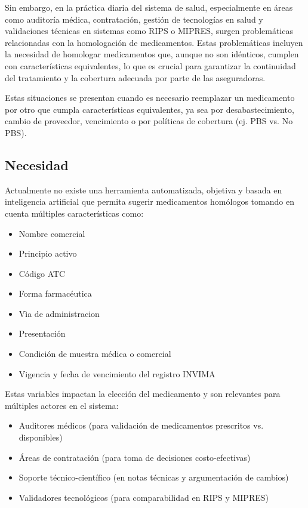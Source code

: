 \documentclass[conference]{IEEEtran}
\begin{document}
Sin embargo, en la práctica diaria del sistema de salud, especialmente en áreas como auditoría médica, contratación, gestión de tecnologías en salud y validaciones técnicas en sistemas como RIPS o MIPRES, surgen problemáticas relacionadas con la homologación de medicamentos. Estas problemáticas incluyen la necesidad de homologar medicamentos que, aunque no son idénticos, cumplen con características equivalentes, lo que es crucial para garantizar la continuidad del tratamiento y la cobertura adecuada por parte de las aseguradoras.

Estas situaciones se presentan cuando es necesario reemplazar un medicamento por otro que cumpla características equivalentes, ya sea por desabastecimiento, cambio de proveedor, vencimiento o por políticas de cobertura (ej. PBS vs. No PBS).



\subsection{Necesidad}\label{AA}
Actualmente no existe una herramienta automatizada, objetiva y basada en inteligencia artificial que permita sugerir medicamentos homólogos tomando en cuenta múltiples características como:
\begin{itemize}
\item Nombre comercial 
\item Principio activo
\item Código ATC
\item Forma farmacéutica
\item Vìa de administracion
\item Presentación
\item Condición de muestra médica o comercial
\item Vigencia y fecha de vencimiento del registro INVIMA
\end{itemize}

Estas variables impactan la elección del medicamento y son relevantes para múltiples actores en el sistema:
\begin{itemize}
\item Auditores médicos (para validación de medicamentos prescritos vs. disponibles)
\item Áreas de contratación (para toma de decisiones costo-efectivas)
\item Soporte técnico-científico (en notas técnicas y argumentación de cambios)
\item Validadores tecnológicos (para comparabilidad en RIPS y MIPRES)
\end{itemize}
\end{document}
